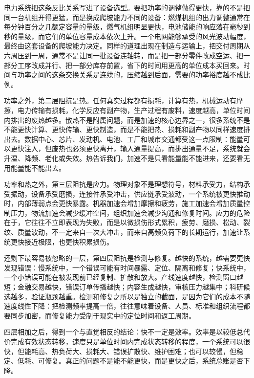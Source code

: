 电力系统把这条反比关系写进了设备选型。要把功率的调整做得更快，靠的不是把同一台机组开得更猛，而是换成爬坡能力不同的设备：燃煤机组的出力调整通常在每分钟百分之几额定容量的量级，燃气机组明显更快，电池储能的响应落在毫秒到秒的量级，而它们的单位容量成本依次上升。一个电网能够承受的风光波动幅度，最终由这套设备的爬坡能力决定。同样的道理出现在制造与运输上，把交付周期从六周压到一周，通常不是让同一批设备连轴转，而是把一部分零件改成空运、把一部分工序改成并行、把一部分库存前置，省下的时间用更高的单位成本买回来。时间与功率之间的这条交换关系是连续的，压缩越到后面，需要的功率裕度越不成比例。

功率之外，第二层阻抗是热。任何真实过程都有损耗，计算有热，机械运动有摩擦，电力传输有损耗，化学反应有副产物，生产过程有废料，速度越高，单位时间内排出的废热越多。散热不是附属问题，而是加速的核心边界之一，很多系统不是不能更快计算、更快传输、更快制造，而是不能把热、损耗和副产物以同样速度排出去。数据中心、芯片、发动机、电池、工厂和城市交通都受这一点限制：能量可以更快注入，但废热也必须更快离开，输入通量提高，而排出通量不足，系统就会升温、降频、老化或失效。热告诉我们，加速不是只看能量能不能进来，还要看无用能量能不能出去。

功率和热之外，第三层阻抗是应力。物理对象不是理想符号，材料承受力，结构承受振动，设备承受磨损，连接件承受冲击，供应链承受波动，一个系统被更快推动时，内部薄弱点会更快暴露。机器加速会增加摩擦和疲劳，施工加速会增加质量控制压力，物流加速会减少缓冲空间，组织加速会减少沟通和修复时间。应力的危险在于，它往往不立即表现为失败，而是以微损伤形式累积，疲劳、磨损、松动、裂纹、质量波动，不一定来自一次大冲击，而来自高频负荷下的长期运行，加速让系统更快接近极限，也更快积累损伤。

还剩下最容易被忽略的一层，第四层阻抗是检测与修复。越快的系统，越需要更快发现错误：慢系统中，一个错误可能有时间暴露、定位、隔离和修复；快系统中，一个小错误可能在被发现前已经复制、扩散和放大。产线速度越快，检测窗口越短；金融交易越快，错误订单传播越快；内容生成越快，审核压力越集中；科研候选越多，验证瓶颈越重。检测和修复之所以是独立的截面，是因为它们的成本不随速度线性下降：把检测频率提高一倍，往往意味着设备、人员、标准和组织流程都要同步加密，而修复能力受制于现实中的定位时间和返工周期。

四层相加之后，得到一个与直觉相反的结论：快不一定是效率。效率是以较低总代价完成有效状态转移，速度只是单位时间内完成状态转移的程度，一个系统可以很快，但能耗高、热负荷大、损耗大、错误扩散快、维护困难；也可以较慢，但稳定、低耗、可修复。真正的问题不是能不能更快，而是更快之后，系统总账是否下降。


